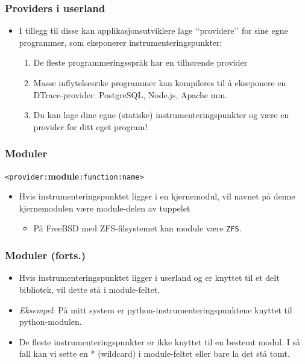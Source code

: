 \documentclass{beamer}
\begin{document}
 \begin{frame}
    \frametitle{Providers i userland}

     \begin{itemize}
         \item I tillegg til disse kan applikasjonsutviklere lage ‘‘providere’’ for sine
    egne programmer, som eksponerer instrumenteringspunkter:
    \begin{enumerate}
        \item De fleste programmeringsspråk har en tilhørende provider
        \item Masse inflytelsesrike programmer kan kompileres til å ekseponere en 
            DTrace-provider: PostgreSQL, Node.js, Apache mm.
        \item Du kan lage dine egne (statiske) instrumenteringspunkter
        og være en provider for ditt eget program!
    \end{enumerate}
     \end{itemize}
 \end{frame}

 \begin{frame}
    \frametitle{Moduler}
    \texttt{<provider:}\textbf{module}\texttt{:function:name>}

     \begin{itemize}

         \item Hvis instrumenteringspunktet ligger i en kjernemodul, vil
    navnet på denne kjernemodulen være module-delen av tuppelet

     \begin{itemize}
         \item På FreeBSD med ZFS-filsystemet kan module være \texttt{ZFS}.
     \end{itemize}
     \end{itemize}
 \end{frame}

 \begin{frame}
     \frametitle{Moduler (forts.)}

     \begin{itemize}
         \item Hvis instrumenteringspunktet ligger i userland og er knyttet til
    et delt bibliotek, vil dette stå i module-feltet.

    \item \emph{Eksempel}: På mitt system er python-instrumenteringspunktene knyttet
        til python-modulen.

    \item  De fleste instrumenteringspunkter er ikke knyttet til en bestemt modul.
        I så fall kan vi sette en * (wildcard) i module-feltet eller bare la det stå tomt.
     \end{itemize}
 \end{frame}
\end{document}
